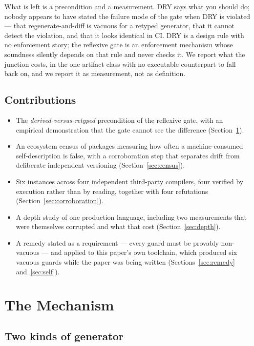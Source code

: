 \documentclass[10pt,journal,compsoc]{IEEEtran}
\begin{document}
What is left is a precondition and a measurement. DRY says what you should do; nobody
appears to have stated the failure mode of the gate when DRY is violated --- that
regenerate-and-diff is vacuous for a retyped generator, that it cannot detect the
violation, and that it looks identical in CI. DRY is a design rule with no enforcement
story; the reflexive gate is an enforcement mechanism whose soundness silently depends
on that rule and never checks it. We report what the junction costs, in the one
artifact class with no executable counterpart to fall back on, and we report it as
measurement, not as definition.

\subsection{Contributions}

\begin{itemize}
\item The \emph{derived-versus-retyped} precondition of the reflexive gate, with an
  empirical demonstration that the gate cannot see the difference
  (Section~\ref{sec:mechanism}).
\item An ecosystem census of \factEcoPackages{} packages measuring how often a
  machine-consumed self-description is false, with a corroboration step that separates
  drift from deliberate independent versioning (Section~\ref{sec:census}).
\item Six instances across four independent third-party compilers, four verified by
  execution rather than by reading, together with four refutations
  (Section~\ref{sec:corroboration}).
\item A depth study of one production language, including two measurements that were
  themselves corrupted and what that cost (Section~\ref{sec:depth}).
\item A remedy stated as a requirement --- every guard must be provably non-vacuous ---
  and applied to this paper's own toolchain, which produced six vacuous guards while
  the paper was being written (Sections~\ref{sec:remedy} and~\ref{sec:self}).
\end{itemize}

\section{The Mechanism}\label{sec:mechanism}

\subsection{Two kinds of generator}
\end{document}

